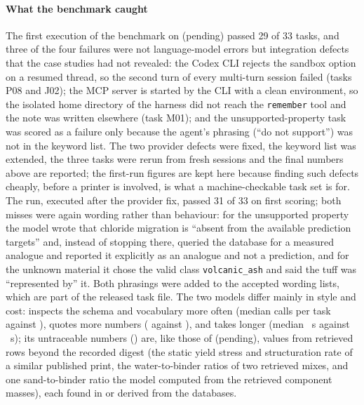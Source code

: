 \documentclass[preprint,12pt]{elsarticle}
\providecommand{\nbenchCxModel}{(pending)}
\begin{document}
\paragraph{What the benchmark caught} The first execution of the benchmark on \nbenchCxModel{} passed 29 of 33 tasks, and three of the four failures were not language-model errors but integration defects that the case studies had not revealed: the Codex CLI rejects the sandbox option on a resumed thread, so the second turn of every multi-turn session failed (tasks P08 and J02); the MCP server is started by the CLI with a clean environment, so the isolated home directory of the harness did not reach the \texttt{remember} tool and the note was written elsewhere (task M01); and the unsupported-property task was scored as a failure only because the agent's phrasing (``do not support'') was not in the keyword list. The two provider defects were fixed, the keyword list was extended, the three tasks were rerun from fresh sessions and the final numbers above are reported; the first-run figures are kept here because finding such defects cheaply, before a printer is involved, is what a machine-checkable task set is for. The \nbenchCsModel{} run, executed after the provider fix, passed 31 of 33 on first scoring; both misses were again wording rather than behaviour: for the unsupported property the model wrote that chloride migration is ``absent from the available prediction targets'' and, instead of stopping there, queried the database for a measured analogue and reported it explicitly as an analogue and not a prediction, and for the unknown material it chose the valid class \texttt{volcanic\_ash} and said the tuff was ``represented by'' it. Both phrasings were added to the accepted wording lists, which are part of the released task file. The two models differ mainly in style and cost: \nbenchCsModel{} inspects the schema and vocabulary more often (median \nbenchCsCallsmedian{} calls per task against \nbenchCxCallsmedian{}), quotes more numbers (\nbenchCsNnumbers{} against \nbenchCxNnumbers{}), and takes longer (median \nbenchCsWallmedian{}~s against \nbenchCxWallmedian{}~s); its untraceable numbers (\nbenchCsNuntraced{}) are, like those of \nbenchCxModel{}, values from retrieved rows beyond the recorded digest (the static yield stress and structuration rate of a similar published print, the water-to-binder ratios of two retrieved mixes, and one sand-to-binder ratio the model computed from the retrieved component masses), each found in or derived from the databases.

\end{document}
